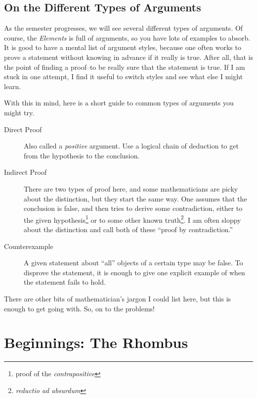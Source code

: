 \documentclass{tufte-handout}
\theoremstyle{definition}
\begin{document}
\subsection*{On the Different Types of Arguments}
As the semester progresses, we will see several different types of arguments.
Of course, the \emph{Elements} is full of arguments, so you have lots of examples to absorb.
It is good to have a mental list of argument styles, because one often works to prove a statement without knowing in advance if it really is true.
After all, that is the point of finding a proof--to be really sure that the statement is true.
If I am stuck in one attempt, I find it useful to switch styles and see what else I might learn.

With this in mind, here is a short guide to common types of arguments you might try.

\begin{description}
\item[Direct Proof] Also called a \emph{positive} argument.
Use a logical chain of deduction to get from the hypothesis to the conclusion.

\item[Indirect Proof] There are two types of proof here, and some mathematicians are picky about the distinction, but they start the same way.
One assumes that the conclusion is false, and then tries to derive some contradiction, either to the given hypothesis\footnote{proof of the \emph{contrapositive}} or to some other known truth\footnote{\emph{reductio ad absurdum}}.
I am often sloppy about the distinction and call both of these ``proof by contradiction.''

\item[Counterexample] A given statement about ``all'' objects of a certain type may be false. To disprove the statement, it is enough to give one explicit example of when the statement fails to hold.
\end{description}

There are other bits of mathematician's jargon I could list here, but this is enough to get going with. So, on to the problems!

\vfill
\pagebreak





\setcounter{section}{1}
\section{Beginnings: The Rhombus}\label{section:rhombi}
\end{document}
